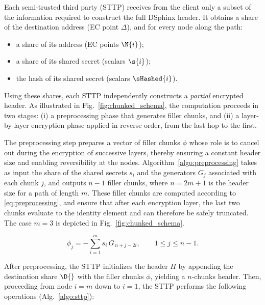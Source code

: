 Each semi-trusted third party (STTP) receives from the client only a subset of the information required to construct the full DSphinx header.
It obtains a share of the destination address (EC point $\Delta$), and for every node along the path:
\begin{itemize}
    \item a share of its address (EC points $\N{i}$);
    \item a share of its shared secret (scalars $\s{i}$);
    \item the hash of its shared secret (scalars $\sHashed{i}$).
\end{itemize}
Using these shares, each STTP independently constructs a \emph{partial} encrypted header.  
As illustrated in Fig.~\ref{fig:chunked_schema}, the computation proceeds in two stages: (i) a preprocessing phase that generates filler chunks, and (ii) a layer-by-layer encryption phase applied in reverse order, from the last hop to the first.

\smallskip
{}
The preprocessing step prepares a vector of filler chunks $\phi$ whose role is to cancel out during the encryption of successive layers, thereby ensuring a constant header size and enabling reversibility at the nodes. 
Algorithm~\ref{algo:preprocessing} takes as input the share of the shared secrets ${s_i}$ and the generators ${G_j}$ associated with each chunk $j$, and outputs $n-1$ filler chunks, where $n = 2m+1$ is the header size for a path of length $m$.
These filler chunks are computed according to \eqref{eq:preprocessing}, and ensure that after each encryption layer, the last two chunks evaluate to the identity element and can therefore be safely truncated.
The case $m=3$ is depicted in Fig.~\ref{fig:chunked_schema}.

\begin{equation}
    \phi_j = - \sum_{i=1}^{m} s_i\, G_{\,n+j-2i}, \qquad 1 \le j \le n-1 .
\label{eq:preprocessing}
\end{equation}

After preprocessing, the STTP initializes the header $H$ by appending the destination share $\D{}$ with the filler chunks $\phi$, yielding a $n$-chunks header.
Then, proceeding from node $i = m$ down to $i = 1$, the STTP performs the following operations (Alg.~\ref{algo:sttp}):

